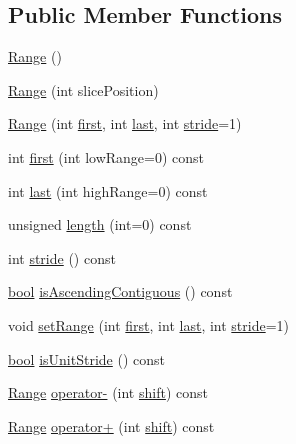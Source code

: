 \subsection*{Public Member Functions}
\begin{DoxyCompactItemize}
\item 
\hyperlink{classRange_aa4407a93074fbb726deb613f7a067983}{Range} ()
\item 
\hyperlink{classRange_a4b4aa80f521929b48eb4862c8f9a405d}{Range} (int slice\+Position)
\item 
\hyperlink{classRange_a5a580d4cec2fa2f9dccf54ae6700c5e8}{Range} (int \hyperlink{classRange_a23f6983e46c5543f3286b730fcaa4e05}{first}, int \hyperlink{classRange_a07e5aa3400f23438fc7c15832dcafab3}{last}, int \hyperlink{classRange_a311708d4f2b18f5492bd2cb9874d52c4}{stride}=1)
\item 
int \hyperlink{classRange_a23f6983e46c5543f3286b730fcaa4e05}{first} (int low\+Range=0) const 
\item 
int \hyperlink{classRange_a07e5aa3400f23438fc7c15832dcafab3}{last} (int high\+Range=0) const 
\item 
unsigned \hyperlink{classRange_a8dab1c96145d27ffcfee84969a8cd02a}{length} (int=0) const 
\item 
int \hyperlink{classRange_a311708d4f2b18f5492bd2cb9874d52c4}{stride} () const 
\item 
\hyperlink{compiler_8h_abb452686968e48b67397da5f97445f5b}{bool} \hyperlink{classRange_a427cdad0d78c8abfb5969e4e35e2c303}{is\+Ascending\+Contiguous} () const 
\item 
void \hyperlink{classRange_af5d1f58f2e05c19747bf9a302edcb6c1}{set\+Range} (int \hyperlink{classRange_a23f6983e46c5543f3286b730fcaa4e05}{first}, int \hyperlink{classRange_a07e5aa3400f23438fc7c15832dcafab3}{last}, int \hyperlink{classRange_a311708d4f2b18f5492bd2cb9874d52c4}{stride}=1)
\item 
\hyperlink{compiler_8h_abb452686968e48b67397da5f97445f5b}{bool} \hyperlink{classRange_a26216cdac88c42b6e32a6bde28ec8350}{is\+Unit\+Stride} () const 
\item 
\hyperlink{classRange}{Range} \hyperlink{classRange_af21628c3bfb7ecedd7f4d8797a34d905}{operator-\/} (int \hyperlink{stencilops_8h_a88153279e7085251440472b9d6606a0e}{shift}) const 
\item 
\hyperlink{classRange}{Range} \hyperlink{classRange_a4543287af5ee79dbd78c9b1903c64a44}{operator+} (int \hyperlink{stencilops_8h_a88153279e7085251440472b9d6606a0e}{shift}) const 
\item 

\end{DoxyCompactItemize}

